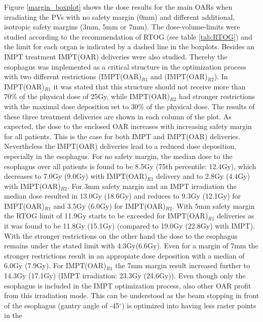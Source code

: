 Figure \ref{margin_boxplot} shows the dose results for the main OARs when irradiating the PVs with no safety margin (0mm) and different additional, 
isotropic safety margins (3mm, 5mm or 7mm). The dose-volume-limits were studied according to the recommendation of RTOG (see table \ref{tab:RTOG}) 
and the limit for each organ is indicated by a dashed line in the boxplots. Besides an IMPT treatment IMPT(OAR) deliveries were also 
studied. Thereby the esophagus was implemented as a critical structure in the optimization process with two different restrictions 
(IMPT(OAR)$_{R1}$ and (IMPT(OAR)$_{R2}$). In IMPT(OAR)$_{R1}$ it was stated that this structure should not receive more than 70\% of the 
physical dose of 25Gy, while IMPT(OAR)$_{R2}$ had stronger restrictions with the maximal dose deposition set to 30\% of the physical dose. 
The results of these three treatment deliveries are shown in each column of the plot.\newline
\newline
As expected, the dose to the enclosed OAR increases with increasing safety margin for all patients. This is the case for both IMPT and IMPT(OAR) 
deliveries. Nevertheless the IMPT(OAR) deliveries lead to a reduced dose deposition, especially in the esophagus. For no safety margin, 
the median dose to the esophagus over all patients is found to be 8.5Gy (75th percentile: 12.4Gy), which decreases to 7.0Gy (9.0Gy) with IMPT(OAR)$_{R1}$ delivery and 
to 2.8Gy (4.4Gy) with IMPT(OAR)$_{R2}$. For 3mm safety margin and an IMPT irradiation the median dose resulted in 13.0Gy (18.6Gy) and reduces to 9.3Gy (12.1Gy) 
for IMPT(OAR)$_{R1}$ and 3.5Gy (6.0Gy) for IMPT(OAR)$_{R2}$. With 5mm safety margin the RTOG limit of 11.9Gy starts to be exceeded for  
IMPT(OAR)$_{R1}$ deliveries as it was found to be 11.8Gy (15.1Gy) (compared to 19.0Gy (22.8Gy) with IMPT). With the stronger restrictions on 
the other hand the dose to the esophagus remains under the stated limit with 4.3Gy(6.6Gy). Even for a margin of 7mm the 
stronger restrictions result in an appropiate dose deposition with a median of 6.0Gy (7.9Gy). 
For IMPT(OAR)$_{R1}$ the 7mm margin result increased further to 14.3Gy (17.1Gy) (IMPT irradiation: 23.3Gy (24.6Gy)).\newline
\newline
Even though only the esophagus is included in the IMPT optimization process, also other OAR profit from this irradiation mode. This can be 
understood as the beam stopping in front of the esophagus (gantry angle of -45$^{\circ}$) is optimized into having less raster points in the 
